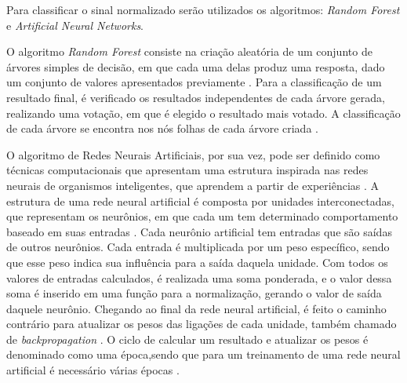 \documentclass[conference]{IEEEtran}
\begin{document}
 
Para classificar o sinal normalizado serão utilizados os algoritmos: \textit{Random Forest} e \textit{Artificial Neural Networks}.

O algoritmo \textit{Random Forest} consiste na criação aleatória de um conjunto de árvores simples de decisão, em que cada uma delas produz uma resposta, dado um conjunto de valores apresentados previamente \cite{statsoft09}. Para a classificação de um resultado final, é verificado os resultados independentes de cada árvore gerada, realizando uma votação, em que é elegido o resultado mais votado. A classificação de cada árvore se encontra nos nós folhas de cada árvore criada \cite{dantas2015}.

O algoritmo de Redes Neurais Artificiais, por sua vez, pode ser definido como técnicas computacionais que apresentam uma estrutura inspirada nas redes neurais de organismos inteligentes, que aprendem a partir de experiências \cite{carvalho09}. A estrutura de uma rede neural artificial é composta por unidades interconectadas, que representam os neurônios, em que cada um tem determinado comportamento baseado em suas entradas \cite{zuben03}. Cada neurônio artificial tem entradas que são saídas de outros neurônios. Cada entrada é multiplicada por um peso específico, sendo que esse peso indica sua influência para a saída daquela unidade. Com todos os valores de entradas calculados, é realizada uma soma ponderada, e o valor dessa soma é inserido em uma função para a normalização, gerando o valor de saída daquele neurônio. Chegando ao final da rede neural artificial, é feito o caminho contrário para atualizar os pesos das ligações de cada unidade, também chamado de \textit{backpropagation} \cite{zuben03}. O ciclo de calcular um resultado e atualizar os pesos é denominado como uma época,sendo que para  um treinamento de uma rede neural artificial é necessário várias épocas \cite{carvalho09}.

%
%
\end{document}
